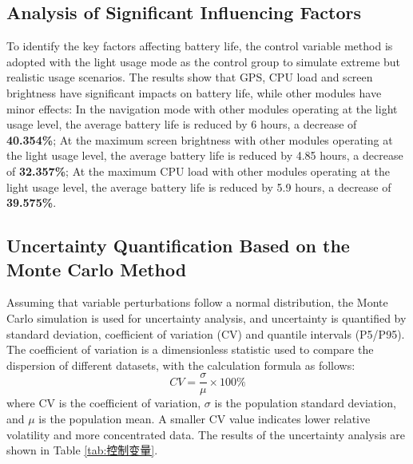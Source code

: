 \documentclass{mcmthesis}  %
\begin{document}
	\subsection{Analysis of Significant Influencing Factors}
	To identify the key factors affecting battery life, the control variable method is adopted with the light usage mode as the control group to simulate extreme but realistic usage scenarios. The results show that GPS, CPU load and screen brightness have significant impacts on battery life, while other modules have minor effects:
	In the navigation mode with other modules operating at the light usage level, the average battery life is reduced by 6 hours, a decrease of \textbf{40.354\%};
	At the maximum screen brightness with other modules operating at the light usage level, the average battery life is reduced by 4.85 hours, a decrease of \textbf{32.357\%};
	At the maximum CPU load with other modules operating at the light usage level, the average battery life is reduced by 5.9 hours, a decrease of \textbf{39.575\%}.
	
	\subsection{Uncertainty Quantification Based on the Monte Carlo Method}
	Assuming that variable perturbations follow a normal distribution, the Monte Carlo simulation is used for uncertainty analysis, and uncertainty is quantified by standard deviation, coefficient of variation (CV) and quantile intervals (P5/P95). The coefficient of variation is a dimensionless statistic used to compare the dispersion of different datasets, with the calculation formula as follows:
	\begin{equation}
		CV = \frac{\sigma}{\mu}\times100\%
		\label{eq:cv}
	\end{equation}
	where $\text{CV}$ is the coefficient of variation, $\sigma$ is the population standard deviation, and $\mu$ is the population mean. A smaller CV value indicates lower relative volatility and more concentrated data. The results of the uncertainty analysis are shown in Table \ref{tab:控制变量}.
	
\end{document}
